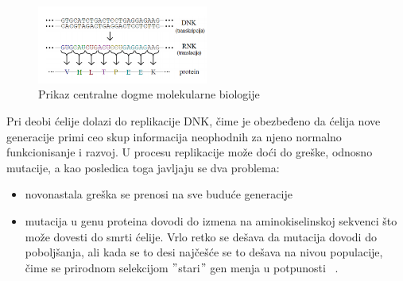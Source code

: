 \begin{figure}[H]
	\centering
    \includegraphics[width=0.5\textwidth]{Figures/BO/dogma.png}
    \caption{Prikaz centralne dogme molekularne biologije~\cite{JKd}}
    \label{fig:dogma}
\end{figure}

Pri deobi ćelije dolazi do replikacije DNK, čime je obezbeđeno da ćelija nove generacije primi ceo skup informacija neophodnih za njeno normalno funkcionisanje i razvoj. U procesu replikacije može doći do greške, odnosno mutacije, a kao posledica toga javljaju se dva problema:
\begin{itemize}
\item novonastala greška se prenosi na sve buduće generacije
\item  mutacija u genu proteina dovodi do izmena na aminokiselinskoj sekvenci što može dovesti do smrti ćelije. Vrlo retko se dešava da mutacija dovodi do poboljšanja, ali kada se to desi najčešće se to dešava na nivou populacije, čime se prirodnom selekcijom $"$stari$"$ gen menja u potpunosti  ~\citep{Principi}.
\end{itemize}


